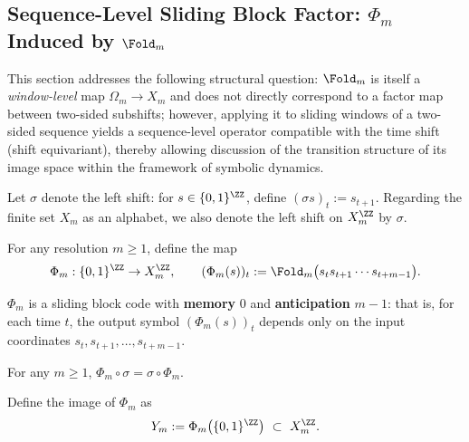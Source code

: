 \subsection{Sequence-Level Sliding Block Factor: \texorpdfstring{$\Phi_m$}{Phi\_m} Induced by \texorpdfstring{$\Fold_m$}{Fold\_m}}\label{subsec:Phi_m-sliding-block-factor}

This section addresses the following structural question: $\Fold_m$ is itself a \emph{window-level} map $\Omega_m\to X_m$ and does not directly correspond to a factor map between two-sided subshifts; however, applying it to sliding windows of a two-sided sequence yields a sequence-level operator compatible with the time shift (shift equivariant), thereby allowing discussion of the transition structure of its image space within the framework of symbolic dynamics.

Let $\sigma$ denote the left shift: for $s\in\{0,1\}^{\ZZ}$, define $(\sigma s)_t:=s_{t+1}$. Regarding the finite set $X_m$ as an alphabet, we also denote the left shift on $X_m^{\ZZ}$ by $\sigma$.

\begin{definition}\label{def:Phi_m}
For any resolution $m\ge 1$, define the map
\[
\Phi_m:\{0,1\}^{\ZZ}\to X_m^{\ZZ},\qquad
(\Phi_m(s))_t:=\Fold_m\bigl(s_t s_{t+1}\cdots s_{t+m-1}\bigr).
\]
\end{definition}

\begin{proposition}\label{prop:Phi_m-radius}
$\Phi_m$ is a sliding block code with \textbf{memory} $0$ and \textbf{anticipation} $m-1$: that is, for each time $t$, the output symbol $(\Phi_m(s))_t$ depends only on the input coordinates
\(
s_t,s_{t+1},\dots,s_{t+m-1}
\).
\end{proposition}

\begin{proposition}\label{prop:Phi_m-equivariant}
For any $m\ge 1$, $\Phi_m\circ\sigma=\sigma\circ\Phi_m$.
\end{proposition}

\begin{definition}\label{def:Y_m}
Define the image of $\Phi_m$ as
\[
Y_m:=\Phi_m\bigl(\{0,1\}^{\ZZ}\bigr)\ \subset\ X_m^{\ZZ}.
\]
\end{definition}

